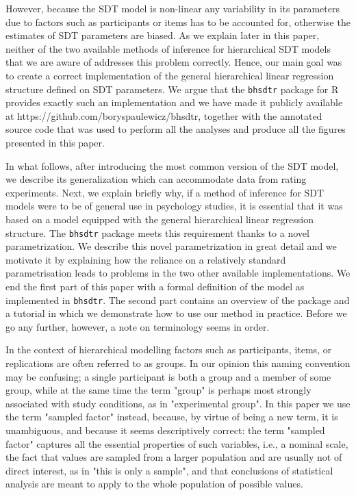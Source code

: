 \documentclass[oneside,a4paper]{article}
\begin{document}
However, because the SDT model is non-linear any variability in its
parameters due to factors such as participants or items has to be
accounted for, otherwise the estimates of SDT parameters are
biased. As we explain later in this paper, neither of the two
available methods of inference for hierarchical SDT models that we are
aware of addresses this problem correctly. Hence, our main goal was to
create a correct implementation of the general hierarchical linear
regression structure defined on SDT parameters. We argue that the
\texttt{bhsdtr} package for R \cite{rstatistical} provides exactly
such an implementation and we have made it publicly available at
https://github.com/boryspaulewicz/bhsdtr, together with the annotated
source code that was used to perform all the analyses and produce all
the figures presented in this paper.


In what follows, after introducing the most common version of the SDT
model, we describe its generalization which can accommodate data from
rating experiments. Next, we explain briefly why, if a method of
inference for SDT models were to be of general use in psychology
studies, it is essential that it was based on a model equipped with
the general hierarchical linear regression structure. The
\texttt{bhsdtr} package meets this requirement thanks to a novel
parametrization. We describe this novel parametrization in great
detail and we motivate it by explaining how the reliance on a
relatively standard parametrisation leads to problems in the two other
available implementations. We end the first part of this paper with a
formal definition of the model as implemented in \texttt{bhsdtr}. The
second part contains an overview of the package and a tutorial in
which we demonstrate how to use our method in practice. Before we go
any further, however, a note on terminology seems in order.


In the context of hierarchical modelling factors such as participants,
items, or replications are often referred to as groups. In our opinion
this naming convention may be confusing; a single participant is both
a group and a member of some group, while at the same time the term
"group" is perhaps most strongly associated with study conditions, as
in "experimental group". In this paper we use the term "sampled
factor" instead, because, by virtue of being a new term, it is
unambiguous, and because it seems descriptively correct: the term
"sampled factor" captures all the essential properties of such
variables, i.e., a nominal scale, the fact that values are sampled
from a larger population and are usually not of direct interest, as in
"this is only a sample", and that conclusions
of statistical analysis are meant to apply to the whole population of
possible values.
\end{document}

